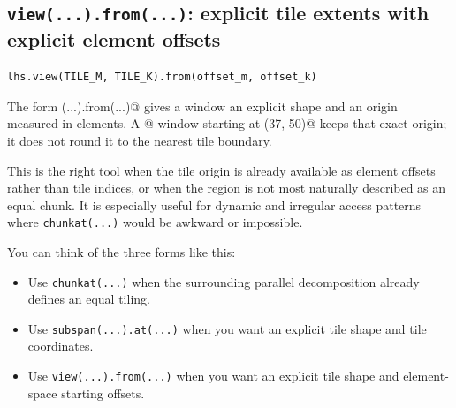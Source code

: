 \subsection*{\texttt{view(.\allowbreak{}.\allowbreak{}.\allowbreak{}).\allowbreak{}from(.\allowbreak{}.\allowbreak{}.\allowbreak{})}: explicit tile extents with explicit element offsets}

\begin{lstlisting}[language=croqtile,caption={view(...).from(...): explicit tile extents with explicit element offsets}]
lhs.view(TILE_M, TILE_K).from(offset_m, offset_k)
\end{lstlisting}

The form \co@view(...).from(...)@ gives a window an explicit shape and an origin measured in elements. A \co@[16, 16]@ window starting at \co@(37, 50)@ keeps that exact origin; it does not round it to the nearest tile boundary.

This is the right tool when the tile origin is already available as element offsets rather than tile indices, or when the region is not most naturally described as an equal chunk. It is especially useful for dynamic and irregular access patterns where \texttt{chunkat(...)} would be awkward or impossible.

You can think of the three forms like this:

\begin{itemize}[leftmargin=1.6em]
\item Use \texttt{chunkat(...)} when the surrounding parallel decomposition already defines an equal tiling.
\item Use \texttt{subspan(.\allowbreak{}.\allowbreak{}.\allowbreak{}).\allowbreak{}at(.\allowbreak{}.\allowbreak{}.\allowbreak{})} when you want an explicit tile shape and tile coordinates.
\item Use \texttt{view(.\allowbreak{}.\allowbreak{}.\allowbreak{}).\allowbreak{}from(.\allowbreak{}.\allowbreak{}.\allowbreak{})} when you want an explicit tile shape and element-space starting offsets.
\end{itemize}
